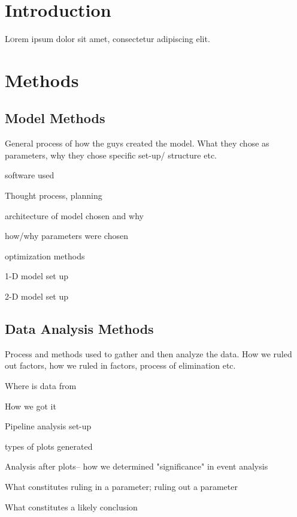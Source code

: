 \documentclass[twoside]{article}
\begin{document}
\begin{multicols}{2} %

\section{Introduction}

\lettrine[nindent=0em,lines=3]{L} orem ipsum dolor sit amet, consectetur adipiscing elit.
\lipsum[2-3] %


\section{Methods}

\subsection{Model Methods}
General process of how the guys created the model. What they chose as parameters, why they chose specific set-up/ structure etc. 
\begin{compactitem}
\item software used
\item Thought process, planning
\item architecture of model chosen and why 
\item how/why parameters were chosen 
\item optimization methods
\item 1-D model set up
\item 2-D model set up
\end{compactitem}

\subsection{Data Analysis Methods}
Process and methods used to gather and then analyze the data. How we ruled out factors, how we ruled in factors, process of elimination etc. 
\begin{compactitem}
	\item Where is data from
	\item How we got it
	\item Pipeline analysis set-up
	\item types of plots generated
	\item Analysis after plots-- how we determined "significance" in event analysis
	\item What constitutes ruling in a parameter; ruling out a parameter 
	\item What constitutes a likely conclusion
\end{compactitem}


\end{multicols}
\end{document}

